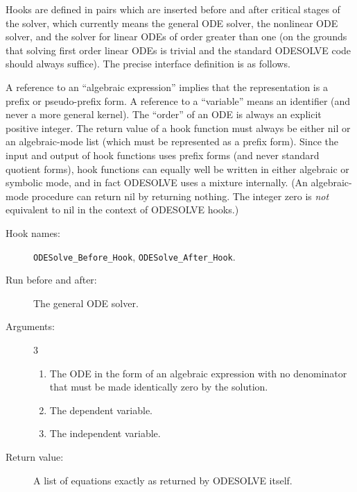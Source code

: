 Hooks are defined in pairs which are inserted before and after
critical stages of the solver, which currently means the general ODE
solver, the nonlinear ODE solver, and the solver for linear ODEs of
order greater than one (on the grounds that solving first order linear
ODEs is trivial and the standard ODESOLVE code should always
suffice).  The precise interface definition is as follows.

A reference to an ``algebraic expression'' implies that the \REDUCE{}
representation is a prefix or pseudo-prefix form.  A reference to a
``variable'' means an identifier (and never a more general kernel).
The ``order'' of an ODE is always an explicit positive integer.  The
return value of a hook function must always be either nil or an
algebraic-mode list (which must be represented as a prefix form).
Since the input and output of hook functions uses prefix forms (and
never standard quotient forms), hook functions can equally well be
written in either algebraic or symbolic mode, and in fact ODESOLVE
uses a mixture internally.  (An algebraic-mode procedure can return
nil by returning nothing.  The integer zero is \emph{not} equivalent
to nil in the context of ODESOLVE hooks.)

\noindent\hrulefill

\begin{description}
\item[Hook names:] \texttt{ODESolve\_Before\_Hook},
\texttt{ODESolve\_After\_Hook}.
\item[Run before and after:] The general ODE solver.
\item[Arguments:] 3
\begin{enumerate}
\item The ODE in the form of an algebraic expression with no
denominator that must be made identically zero by the solution.
\item The dependent variable.
\item The independent variable.
\end{enumerate}
\item[Return value:] A list of equations exactly as returned by
ODESOLVE itself.
\end{description}

\noindent\hrulefill

